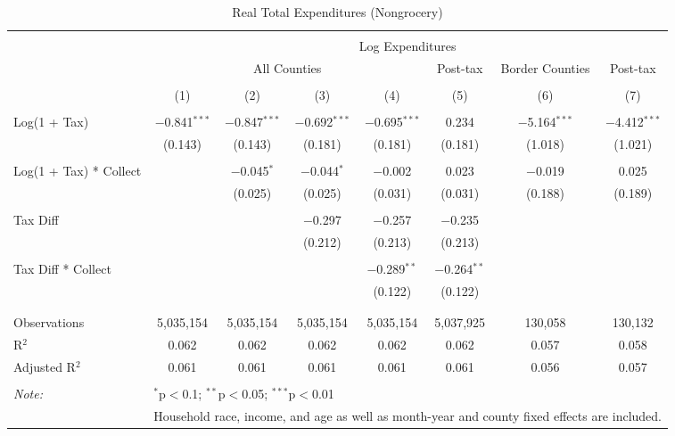
\begin{table}[!htbp] \centering 
  \caption{Real Total Expenditures (Nongrocery)} 
  \label{} 
\begin{tabular}{@{\extracolsep{5pt}}lccccccc} 
\\[-1.8ex]\hline 
\hline \\[-1.8ex] 
 & \multicolumn{7}{c}{Log Expenditures} \\ 
\cline{2-8} 
 & \multicolumn{4}{c}{All Counties} & Post-tax & Border Counties & Post-tax \\ 
\\[-1.8ex] & (1) & (2) & (3) & (4) & (5) & (6) & (7)\\ 
\hline \\[-1.8ex] 
 Log(1 + Tax) & $-$0.841$^{***}$ & $-$0.847$^{***}$ & $-$0.692$^{***}$ & $-$0.695$^{***}$ & 0.234 & $-$5.164$^{***}$ & $-$4.412$^{***}$ \\ 
  & (0.143) & (0.143) & (0.181) & (0.181) & (0.181) & (1.018) & (1.021) \\ 
  & & & & & & & \\ 
 Log(1 + Tax) * Collect &  & $-$0.045$^{*}$ & $-$0.044$^{*}$ & $-$0.002 & 0.023 & $-$0.019 & 0.025 \\ 
  &  & (0.025) & (0.025) & (0.031) & (0.031) & (0.188) & (0.189) \\ 
  & & & & & & & \\ 
 Tax Diff &  &  & $-$0.297 & $-$0.257 & $-$0.235 &  &  \\ 
  &  &  & (0.212) & (0.213) & (0.213) &  &  \\ 
  & & & & & & & \\ 
 Tax Diff * Collect &  &  &  & $-$0.289$^{**}$ & $-$0.264$^{**}$ &  &  \\ 
  &  &  &  & (0.122) & (0.122) &  &  \\ 
  & & & & & & & \\ 
\hline \\[-1.8ex] 
Observations & 5,035,154 & 5,035,154 & 5,035,154 & 5,035,154 & 5,037,925 & 130,058 & 130,132 \\ 
R$^{2}$ & 0.062 & 0.062 & 0.062 & 0.062 & 0.062 & 0.057 & 0.058 \\ 
Adjusted R$^{2}$ & 0.061 & 0.061 & 0.061 & 0.061 & 0.061 & 0.056 & 0.057 \\ 
\hline 
\hline \\[-1.8ex] 
\textit{Note:}  & \multicolumn{7}{l}{$^{*}$p$<$0.1; $^{**}$p$<$0.05; $^{***}$p$<$0.01} \\ 
 & \multicolumn{7}{l}{Household race, income, and age as well as month-year and county fixed effects are included.} \\ 
\end{tabular} 
\end{table} 
